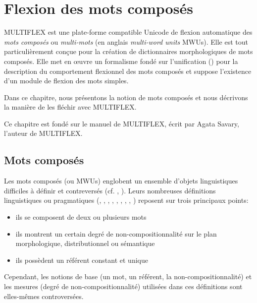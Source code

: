 \chapter{Flexion des mots composés}

\label{chap-multiflex}
MULTIFLEX est une plate-forme compatible Unicode de flexion automatique des \textit{mots composés}
ou \textit{multi-mots} (en anglais \textit{multi-word units}  MWUs).
Elle est tout particulièrement conçue pour la création de dictionnaires morphologiques de mots
composés.
Elle met en {\oe}uvre un formalisme fondé sur l'unification (\cite{Savary05}) 
pour la description du comportement flexionnel des mots composés et suppose l'existence d'un module
de flexion des mots simples.

\bigskip
\noindent Dans ce chapitre, nous présentons la notion de mots composés et nous décrivons la manière
de les fléchir avec MULTIFLEX.

\bigskip
\noindent Ce chapitre est fondé sur le manuel de MULTIFLEX, écrit par Agata Savary, l'auteur de
MULTIFLEX.

\section{Mots composés}
\label{section:MWUs}
Les mots composés (ou MWUs) englobent un ensemble d'objets linguistiques difficiles à définir et
contreversés  (cf. \cite{HabertJacquemin93}, \cite{Corbin92}). Leurs nombreuses définitions
linguistiques ou pragmatiques (\cite{Benven74}, \cite{Downing77}, \cite{Levi78}, 
\cite{Bauer83}, \cite{Gross90}, \cite{Anscombre90}, \cite{max-1993},
\cite{Gross96}, \cite{Cadiot92}) reposent sur trois principaux points:

\begin{itemize}
\item ils se composent de deux ou plusieurs mots
\item ils montrent un certain degré de non-compositionnalité sur le plan morphologique,
	distributionnel ou sémantique
\item ils possèdent un référent constant et unique
\end{itemize}

\bigskip
\noindent Cependant, les notions de base (un mot, un référent, la non-compositionnalité) et les
mesures (degré de non-compositionnalité) utilisées dans ces  définitions sont elles-mêmes
controversées.

